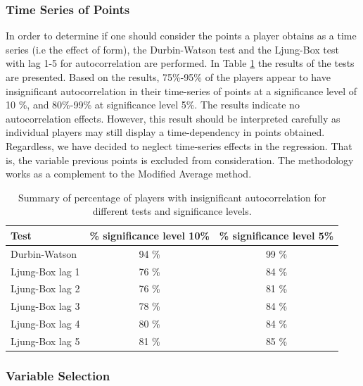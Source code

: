 \subsubsection{Time Series of Points}

In order to determine if one should consider the points a player obtains as a time series (i.e the effect of form), the Durbin-Watson test and the Ljung-Box test with lag 1-5 for autocorrelation are performed. In Table \ref{tab:auto_tests} the results of the tests are presented. Based on the results, 75\%-95\% of the players appear to have insignificant autocorrelation in their time-series of points at a significance level of 10 \%, and 80\%-99\% at significance level 5\%. The results indicate no autocorrelation effects. However, this result should be interpreted carefully as individual players may still display a time-dependency in points obtained. Regardless, we have decided to neglect time-series effects in the regression. That is, the variable previous points is excluded from consideration. The methodology works as a complement to the Modified Average method.

\begin{table}[H]
\centering
\begin{tabular}{|l|c|c|}
\hline
Test            & \% significance level 10\% & \% significance level 5\% \\
\hline
Durbin-Watson   & 94 \% & 99 \%                                            \\
Ljung-Box lag 1 & 76 \% & 84 \%                                            \\
Ljung-Box lag 2 & 76 \% & 81 \%                                            \\
Ljung-Box lag 3 & 78 \% & 84 \%                                            \\
Ljung-Box lag 4 & 80 \% & 84 \%                                           \\
Ljung-Box lag 5 & 81 \% & 85 \%                
\\
\hline
\end{tabular}
\caption{Summary of percentage of players with insignificant autocorrelation for different tests and significance levels.}
\label{tab:auto_tests}
\end{table}

\subsubsection{Variable Selection}

